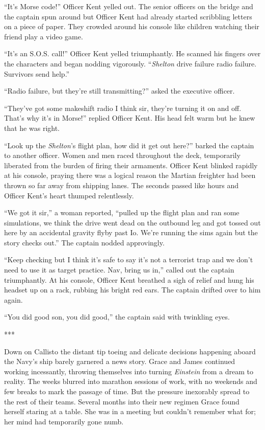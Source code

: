 \documentclass[12pt]{article} %
\begin{document}
``It's Morse code!'' Officer Kent yelled out. The senior officers on the bridge and the captain spun around but Officer Kent had already started scribbling letters on a piece of paper. They crowded around his console like children watching their friend play a video game.

``It's an S.O.S. call!'' Officer Kent yelled triumphantly. He scanned his fingers over the characters and began nodding vigorously. ``\textit{Shelton} drive failure radio failure. Survivors send help.''

``Radio failure, but they're still transmitting?'' asked the executive officer.

``They've got some makeshift radio I think sir, they're turning it on and off. That's why it's in Morse!'' replied Officer Kent. His head felt warm but he knew that he was right.

``Look up the \textit{Shelton}'s flight plan, how did it get out here?'' barked the captain to another officer. Women and men raced throughout the deck, temporarily liberated from the burden of firing their armaments. Officer Kent blinked rapidly at his console, praying there was a logical reason the Martian freighter had been thrown so far away from shipping lanes. The seconds passed like hours and Officer Kent's heart thumped relentlessly.

``We got it sir,'' a woman reported, ``pulled up the flight plan and ran some simulations, we think the drive went dead on the outbound leg and got tossed out here by an accidental gravity flyby past Io. We're running the sims again but the story checks out.'' The captain nodded approvingly.

``Keep checking but I think it's safe to say it's not a terrorist trap and we don't need to use it as target practice. Nav, bring us in,'' called out the captain triumphantly. At his console, Officer Kent breathed a sigh of relief and hung his headset up on a rack, rubbing his bright red ears. The captain drifted over to him again.

``You did good son, you did good,'' the captain said with twinkling eyes.

\begin{center}
***
\end{center}

Down on Callisto the distant tip toeing and delicate decisions happening aboard the Navy's ship barely garnered a news story. Grace and James continued working incessantly, throwing themselves into turning \textit{Einstein} from a dream to reality. The weeks blurred into marathon sessions of work, with no weekends and few breaks to mark the passage of time. But the pressure inexorably spread to the rest of their teams. Several months into their new regimen Grace found herself staring at a table. She was in a meeting but couldn't remember what for; her mind had temporarily gone numb.
\end{document}
